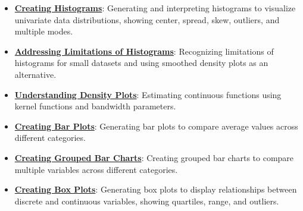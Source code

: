 \documentclass{article}%
\begin{document}
\begin{itemize}[leftmargin=*]
\item \href{https://purdue.brightspace.com/d2l/common/assets/pdfjs-d2l-dist/1.0.14-legacy/web/viewer.html?file=\%2Fcontent\%2Fenforced\%2F1095465-WL.202510.CS24200.LE1\%2F10L2-Vis.pdf\%3Fou\%3D1095465\&lang=en-us\&container=d2l-fileviewer-rendered-pdf\&fullscreen=d2l-fileviewer-rendered-pdf-dialog\&height=667#page=28}{\textbf{Creating Histograms}}: Generating and interpreting histograms to visualize univariate data distributions, showing center, spread, skew, outliers, and multiple modes.%
\item \href{https://purdue.brightspace.com/d2l/common/assets/pdfjs-d2l-dist/1.0.14-legacy/web/viewer.html?file=\%2Fcontent\%2Fenforced\%2F1095465-WL.202510.CS24200.LE1\%2F10L2-Vis.pdf\%3Fou\%3D1095465\&lang=en-us\&container=d2l-fileviewer-rendered-pdf\&fullscreen=d2l-fileviewer-rendered-pdf-dialog\&height=667#page=31}{\textbf{Addressing Limitations of Histograms}}: Recognizing limitations of histograms for small datasets and using smoothed density plots as an alternative.%
\item \href{https://purdue.brightspace.com/d2l/common/assets/pdfjs-d2l-dist/1.0.14-legacy/web/viewer.html?file=\%2Fcontent\%2Fenforced\%2F1095465-WL.202510.CS24200.LE1\%2F10L2-Vis.pdf\%3Fou\%3D1095465\&lang=en-us\&container=d2l-fileviewer-rendered-pdf\&fullscreen=d2l-fileviewer-rendered-pdf-dialog\&height=667#page=32}{\textbf{Understanding Density Plots}}: Estimating continuous functions using kernel functions and bandwidth parameters.%
\item \href{https://purdue.brightspace.com/d2l/common/assets/pdfjs-d2l-dist/1.0.14-legacy/web/viewer.html?file=\%2Fcontent\%2Fenforced\%2F1095465-WL.202510.CS24200.LE1\%2F10L2-Vis.pdf\%3Fou\%3D1095465\&lang=en-us\&container=d2l-fileviewer-rendered-pdf\&fullscreen=d2l-fileviewer-rendered-pdf-dialog\&height=667#page=33}{\textbf{Creating Bar Plots}}: Generating bar plots to compare average values across different categories.%
\item \href{https://purdue.brightspace.com/d2l/common/assets/pdfjs-d2l-dist/1.0.14-legacy/web/viewer.html?file=\%2Fcontent\%2Fenforced\%2F1095465-WL.202510.CS24200.LE1\%2F10L2-Vis.pdf\%3Fou\%3D1095465\&lang=en-us\&container=d2l-fileviewer-rendered-pdf\&fullscreen=d2l-fileviewer-rendered-pdf-dialog\&height=667#page=35}{\textbf{Creating Grouped Bar Charts}}: Creating grouped bar charts to compare multiple variables across different categories.%
\item \href{https://purdue.brightspace.com/d2l/common/assets/pdfjs-d2l-dist/1.0.14-legacy/web/viewer.html?file=\%2Fcontent\%2Fenforced\%2F1095465-WL.202510.CS24200.LE1\%2F10L2-Vis.pdf\%3Fou\%3D1095465\&lang=en-us\&container=d2l-fileviewer-rendered-pdf\&fullscreen=d2l-fileviewer-rendered-pdf-dialog\&height=667#page=36}{\textbf{Creating Box Plots}}: Generating box plots to display relationships between discrete and continuous variables, showing quartiles, range, and outliers.%

\end{itemize}
\end{document}
